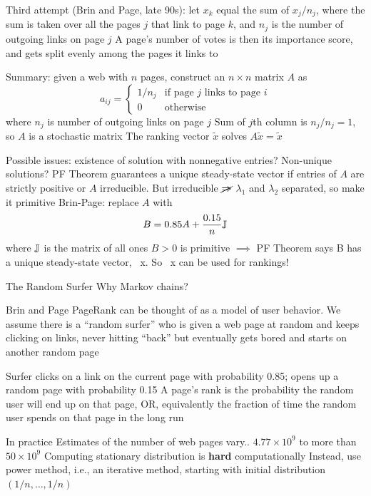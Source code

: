 \documentclass[aspectratio=169]{beamer}\usepackage[]{graphicx}\usepackage[]{xcolor}
\begin{document}
\begin{frame}{}
	Third attempt (Brin and Page, late 90s): let $x_k$ equal the sum of $x_j/n_j$, where
	the sum is taken over all the pages $j$ that link to page $k$, and $n_j$ is the number of outgoing links on page $j$
	\vfill
	A page's number of votes is then its importance score, and gets split evenly among the pages it links to
\end{frame}

\begin{frame}{}
	Summary: given a web with $n$ pages, construct an $n\times n$ matrix $A$ as
	\[
	a_{ij} =
	\begin{cases}
		1/n_j & \text{if page $j$ links to page $i$} \\
		0 & \text{otherwise}
	\end{cases}
	\]
	where $n_j$ is number of outgoing links on page $j$
	\vfill
	Sum of $j$th column is $n_j/n_j = 1$, so $A$ is a stochastic matrix
	\vfill
	The ranking vector $\tilde x$ solves $A\tilde x = \tilde x$
\end{frame}


\begin{frame}{}
	Possible issues: existence of solution with nonnegative entries? Non-unique solutions?	
	\vfill
	PF Theorem guarantees a unique steady-state vector if entries of $A$ are strictly positive or $A$ irreducible. But irreducible $\cancel{\Rightarrow}$ $\lambda_1$ and $\lambda_2$ separated, so make it primitive
	\vfill
	Brin-Page: replace $A$ with
	\[
		B = 0.85A + \frac{0.15}{n}\mathbb{J}
	\]
	where $\mathbb{J}$ is the matrix of all ones
\vfill
$B>0$ is primitive $\implies$
PF Theorem says B has a unique steady-state vector, ~x.
So ~x can be used for rankings!
\end{frame}

\begin{frame}{The Random Surfer}
	Why Markov chains?
	\vfill
\begin{block}{Brin and Page}
	PageRank can be thought of as a model of user behavior. We assume there is a ``random surfer'' who is given a web page at random and keeps clicking on links, never hitting ``back'' but eventually gets bored and starts on another random page
\end{block}
\vfill
Surfer clicks on a link on the current page with probability 0.85; opens up a random page with probability 0.15
\vfill
A page's rank is the probability the random user will end up on that page, OR, equivalently the fraction of time the random user spends on that page in the long run
\end{frame}


\begin{frame}{In practice}
	Estimates of the number of web pages vary.. $4.77\times 10^9$ to more than $50\times 10^9$
	\vfill 
	Computing stationary distribution is \textbf{hard} computationally
	\vfill
	Instead, use power method, i.e., an iterative method, starting with initial distribution $(1/n,\ldots,1/n)$
\end{frame}
\end{document}
